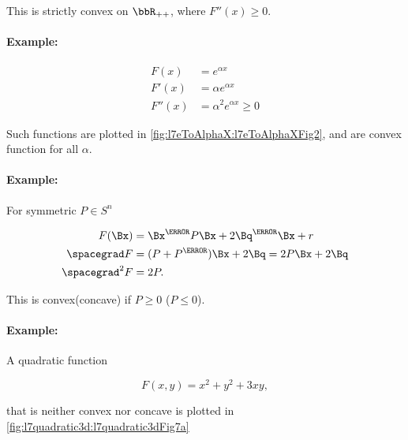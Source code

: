 This is strictly convex on
\( \bbR_{++} \), where
\( F''(x) \ge 0 \).

\paragraph{Example:}

\begin{dmath}\label{eqn:convexOptimizationLecture7:120}
\begin{aligned}
F(x) &= e^{\alpha x} \\
F'(x) &= \alpha e^{\alpha x} \\
F''(x) &= \alpha^2 e^{\alpha x} \ge 0
\end{aligned}
\end{dmath}


Such functions are plotted in
\cref{fig:l7eToAlphaX:l7eToAlphaXFig2}, and are
convex function for all \( \alpha \).

\paragraph{Example:}

For symmetric \( P \in S^n \)

\begin{dmath}\label{eqn:convexOptimizationLecture7:140}
\begin{aligned}
F(\Bx) &= \Bx^\T P \Bx + 2 \Bq^\T \Bx + r \\
\spacegrad F &= (P + P^\T) \Bx + 2 \Bq = 2 P \Bx + 2 \Bq \\
\spacegrad^2 F &= 2 P.
\end{aligned}
\end{dmath}

This is convex(concave) if \( P \ge 0 \) (\( P \le 0\)).

\paragraph{Example:}

A quadratic function

\begin{dmath}\label{eqn:convexOptimizationLecture7:780}
F(x, y) = x^2 + y^2 + 3 x y,
\end{dmath}

that is neither convex nor concave is plotted in \cref{fig:l7quadratic3d:l7quadratic3dFig7a}

